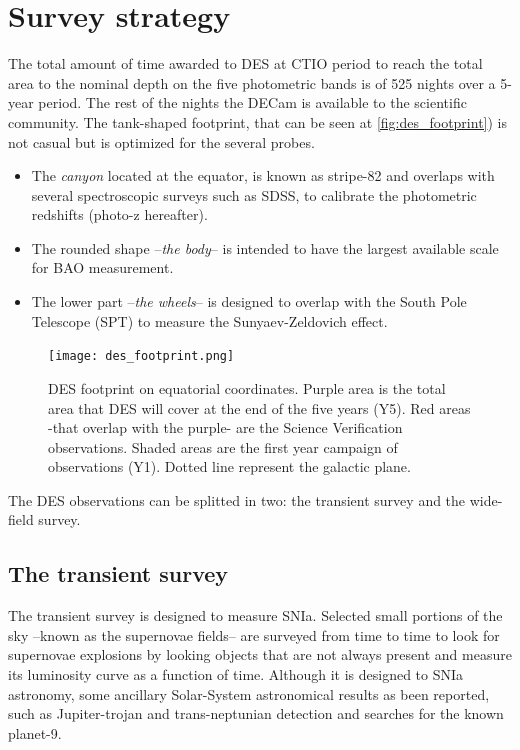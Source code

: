 \section{Survey strategy}
The total amount of time awarded to DES at CTIO period to reach the total area to the nominal depth on the five photometric bands is of 525 nights over a 5-year period. The rest of the nights the DECam is available to the scientific community. The tank-shaped footprint, that can be seen at \autoref{fig:des_footprint}) is not casual but is optimized for the several probes.
\begin{itemize}
	\item The {\it canyon} located at the equator, is known as stripe-82 and overlaps with several spectroscopic surveys such as SDSS, to calibrate the photometric redshifts (photo-z hereafter).
    \item The rounded shape --{\it the body}-- is intended to have the largest available scale for BAO measurement.
    \item The lower part --{\it the wheels}-- is designed to overlap with the South Pole Telescope (SPT) to measure the Sunyaev-Zeldovich effect.
\end{itemize}

\begin{figure}
\texttt{[image: des\_footprint.png]}
\caption{DES footprint on equatorial coordinates. Purple area is the total area that DES will cover at the end of the five years (Y5). Red areas -that overlap with the purple- are the Science Verification observations. Shaded areas are the first year campaign of observations (Y1). Dotted line represent the galactic plane.}
\label{fig:des_footprint}
\end{figure}

The DES observations can be splitted in two: the transient survey and the wide-field survey.

\subsection{The transient survey}
The transient survey is designed to measure SNIa. Selected small portions of the sky --known as the supernovae fields-- are surveyed from time to time to look for supernovae explosions by looking objects that are not always present and measure its luminosity curve as a function of time. Although it is designed to SNIa astronomy, some ancillary Solar-System astronomical results as been reported, such as Jupiter-trojan and trans-neptunian detection and searches for the known planet-9.

